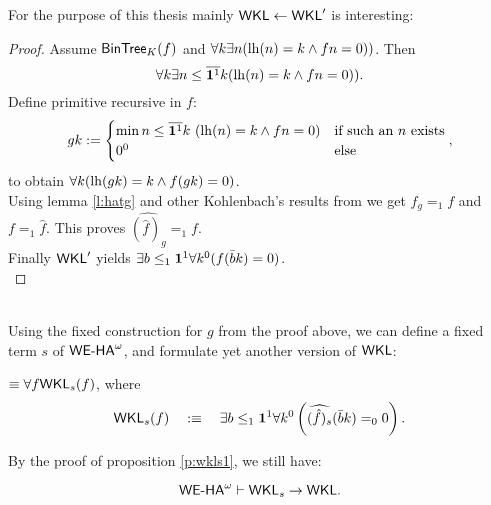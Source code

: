 For the purpose of this thesis mainly 
$\textsf{\upshape WKL}\leftarrow\textsf{\upshape WKL}'$ is interesting:\\
\begin{proof}
Assume $\textsf{\upshape BinTree}_K(f)$ and $\forall k \exists n (\operatorname{lh}(n)=k \wedge fn=0))$. Then
\[
\forall k \exists n\leq\overline{\mathbf1^1}k (\operatorname{lh}(n)=k \wedge fn=0))\text{.}
\]
Define primitive recursive in $f$:
\[
gk:=\begin{cases}
\min n\leq\overline{\mathbf1^1}k\ (\operatorname{lh}(n)=k \wedge fn=0)&\text{if such an $n$ exists}\\
0^0&\text{else}
\end{cases} \text{,}
\]
to obtain $\forall k(\operatorname{lh}(gk)=k\wedge f(gk)=0)$.\\
Using lemma \ref{l:hatg} and other Kohlenbach's results 
from \cite{Kohlenbach08} we get $f_g=_1f$ and $f=_1\hat f$.
This proves $\widehat{(\hat f)_g}=_1 f$.\\
Finally $\textsf{\upshape WKL}'$ yields $\exists b\leq_1 \mathbf1^1\forall k^0(f(\bar bk)=0)$.\\
\end{proof}\\
Using the fixed construction for $g$ from the proof above, we can define a fixed
term $s$ of ${\textsf{\upshape WE-HA}}^{\omega}$, and formulate yet another version of $\textsf{\upshape WKL}$:
\begin{dfn}{$\equiv\forall f\textsf{\upshape WKL}_s(f)$}, where
\[
\textsf{\upshape WKL}_s(f)\quad:\equiv\quad \exists b\leq_1\mathbf1^1\forall k^0
  \left(\widehat{(\hat f)_{s}} (\bar bk)=_00\right)\text{.}
\]
\end{dfn}
By the proof of proposition \ref{p:wkls1}, we still have:
\begin{prop}\label{p:wkls2}
 \[ {\textsf{\upshape WE-HA}}^{\omega}\vdash\textsf{\upshape WKL}_s\rightarrow\textsf{\upshape WKL}
\text{.}
\]
\end{prop}

%
%
